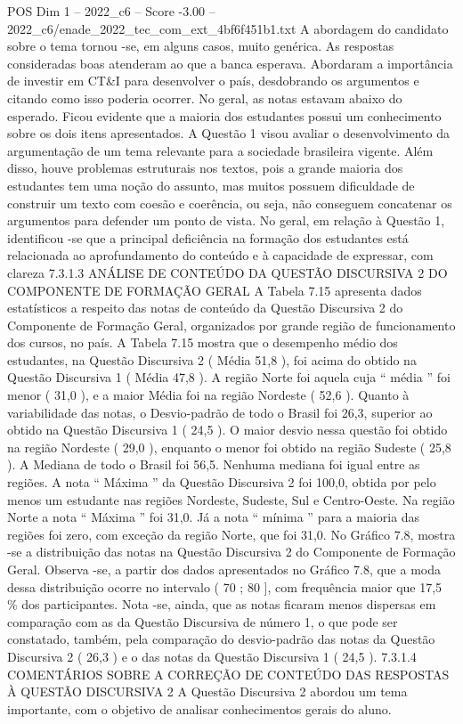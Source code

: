 \begin{textsample}{POS Dim 1 – 2022\_c6 – Score -3.00 – 2022\_c6/enade\_2022\_tec\_com\_ext\_4bf6f451b1.txt}
A abordagem do candidato sobre o tema tornou -se, em alguns casos, muito genérica.
As respostas consideradas boas atenderam ao que a banca esperava.
Abordaram a importância de investir em CT\&I para desenvolver o país, desdobrando os argumentos e citando como isso poderia ocorrer.
No geral, as notas estavam abaixo do esperado.
Ficou evidente que a maioria dos estudantes possui um conhecimento sobre os dois itens apresentados.
A Questão 1 visou avaliar o desenvolvimento da argumentação de um tema relevante para a sociedade brasileira vigente.
Além disso, houve problemas estruturais nos textos, pois a grande maioria dos estudantes tem uma noção do assunto, mas muitos possuem dificuldade de construir um texto com coesão e coerência, ou seja, não conseguem concatenar os argumentos para defender um ponto de vista.
No geral, em relação à Questão 1, identificou -se que a principal deficiência na formação dos estudantes está relacionada ao aprofundamento do conteúdo e à capacidade de expressar, com clareza 7.3.1.3 ANÁLISE DE CONTEÚDO DA QUESTÃO DISCURSIVA 2 DO COMPONENTE DE FORMAÇÃO GERAL A Tabela 7.15 apresenta dados estatísticos a respeito das notas de conteúdo da Questão Discursiva 2 do Componente de Formação Geral, organizados por grande região de funcionamento dos cursos, no país.
A Tabela 7.15 mostra que o desempenho médio dos estudantes, na Questão Discursiva 2 ( Média 51,8 ), foi acima do obtido na Questão Discursiva 1 ( Média 47,8 ).
A região Norte foi aquela cuja “ média ” foi menor ( 31,0 ), e a maior Média foi na região Nordeste ( 52,6 ).
Quanto à variabilidade das notas, o Desvio-padrão de todo o Brasil foi 26,3, superior ao obtido na Questão Discursiva 1 ( 24,5 ).
O maior desvio nessa questão foi obtido na região Nordeste ( 29,0 ), enquanto o menor foi obtido na região Sudeste ( 25,8 ).
A Mediana de todo o Brasil foi 56,5.
Nenhuma mediana foi igual entre as regiões.
A nota “ Máxima ” da Questão Discursiva 2 foi 100,0, obtida por pelo menos um estudante nas regiões Nordeste, Sudeste, Sul e Centro-Oeste.
Na região Norte a nota “ Máxima ” foi 31,0.
Já a nota “ mínima ” para a maioria das regiões foi zero, com exceção da região Norte, que foi 31,0.
No Gráfico 7.8, mostra -se a distribuição das notas na Questão Discursiva 2 do Componente de Formação Geral.
Observa -se, a partir dos dados apresentados no Gráfico 7.8, que a moda dessa distribuição ocorre no intervalo ( 70 ; 80 ], com frequência maior que 17,5 \% dos participantes.
Nota -se, ainda, que as notas ficaram menos dispersas em comparação com as da Questão Discursiva de número 1, o que pode ser constatado, também, pela comparação do desvio-padrão das notas da Questão Discursiva 2 ( 26,3 ) e o das notas da Questão Discursiva 1 ( 24,5 ). 7.3.1.4 COMENTÁRIOS SOBRE A CORREÇÃO DE CONTEÚDO DAS RESPOSTAS À QUESTÃO DISCURSIVA 2 A Questão Discursiva 2 abordou um tema importante, com o objetivo de analisar conhecimentos gerais do aluno.

\end{textsample}
